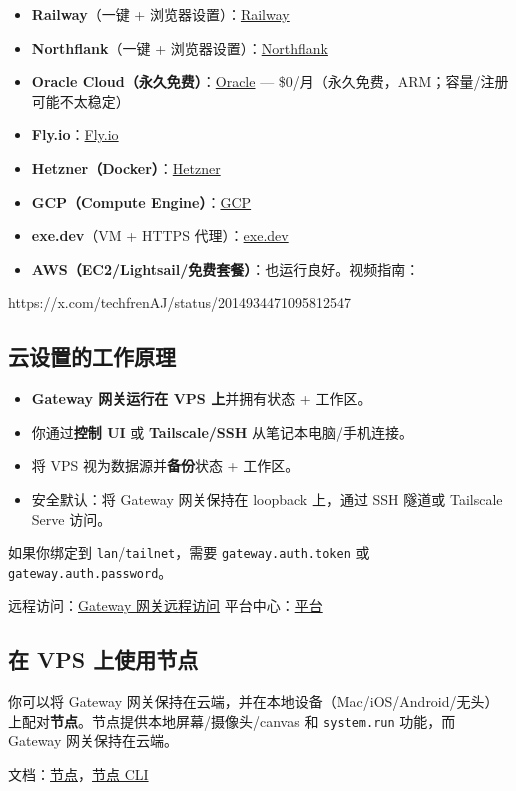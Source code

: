 \begin{itemize}
  \item \textbf{Railway}（一键 + 浏览器设置）：\href{/install/railway}{Railway}
  \item \textbf{Northflank}（一键 + 浏览器设置）：\href{/install/northflank}{Northflank}
  \item \textbf{Oracle Cloud（永久免费）}：\href{/platforms/oracle}{Oracle} — \$0/月（永久免费，ARM；容量/注册可能不太稳定）
  \item \textbf{Fly.io}：\href{/install/fly}{Fly.io}
  \item \textbf{Hetzner（Docker）}：\href{/install/hetzner}{Hetzner}
  \item \textbf{GCP（Compute Engine）}：\href{/install/gcp}{GCP}
  \item \textbf{exe.dev}（VM + HTTPS 代理）：\href{/install/exe-dev}{exe.dev}
  \item \textbf{AWS（EC2/Lightsail/免费套餐）}：也运行良好。视频指南：
\end{itemize}

https://x.com/techfrenAJ/status/2014934471095812547

\subsection{云设置的工作原理}


\begin{itemize}
  \item \textbf{Gateway 网关运行在 VPS 上}并拥有状态 + 工作区。
  \item 你通过\textbf{控制 UI} 或 \textbf{Tailscale/SSH} 从笔记本电脑/手机连接。
  \item 将 VPS 视为数据源并\textbf{备份}状态 + 工作区。
  \item 安全默认：将 Gateway 网关保持在 loopback 上，通过 SSH 隧道或 Tailscale Serve 访问。
\end{itemize}

如果你绑定到 \texttt{lan}/\texttt{tailnet}，需要 \texttt{gateway.auth.token} 或 \texttt{gateway.auth.password}。

远程访问：\href{/gateway/remote}{Gateway 网关远程访问}
平台中心：\href{/platforms}{平台}

\subsection{在 VPS 上使用节点}


你可以将 Gateway 网关保持在云端，并在本地设备（Mac/iOS/Android/无头）上配对\textbf{节点}。节点提供本地屏幕/摄像头/canvas 和 \texttt{system.run} 功能，而 Gateway 网关保持在云端。

文档：\href{/nodes}{节点}，\href{/cli/nodes}{节点 CLI}


\clearpage
